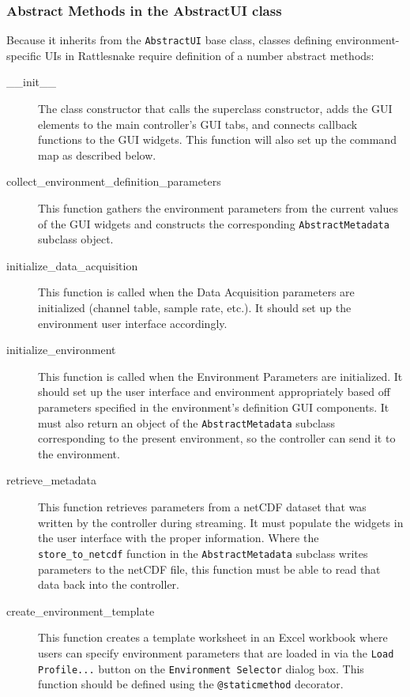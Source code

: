 \documentclass[pdf,12pt,report]{SANDreport}
\newcommand{\inlineCode}{\lstinline[basicstyle=\bfseries\ttfamily]}
\begin{document}
    \subsubsection{Abstract Methods in the AbstractUI class}
    
    Because it inherits from the \inlineCode{AbstractUI} base class, classes defining environment-specific \ac{UI}s in Rattlesnake require definition of a number abstract methods:
    
    \begin{description}
    \item[\_\_init\_\_] The class constructor that calls the superclass constructor, adds the \ac{GUI} elements to the main controller's \ac{GUI} tabs, and connects callback functions to the \ac{GUI} widgets.  This function will also set up the command map as described below.
   
    \item[collect\_environment\_definition\_parameters] This function gathers the environment parameters from the current values of the \ac{GUI} widgets and constructs the corresponding \inlineCode{AbstractMetadata} subclass object.
    
    \item[initialize\_data\_acquisition] This function is called when the Data Acquisition parameters are initialized (channel table, sample rate, etc.).  It should set up the environment user interface accordingly.
    
    \item[initialize\_environment] This function is called when the Environment Parameters are initialized.  It should set up the user interface and environment appropriately based off parameters specified in the environment's definition \ac{GUI} components.  It must also return an object of the \inlineCode{AbstractMetadata} subclass corresponding to the present environment, so the controller can send it to the environment.
    
    \item[retrieve\_metadata] This function retrieves parameters from a netCDF dataset that was written by the controller during streaming.  It must populate the widgets in the user interface with the proper information.  Where the \inlineCode{store_to_netcdf} function in the \inlineCode{AbstractMetadata} subclass writes parameters to the netCDF file, this function must be able to read that data back into the controller.
    
    \item[create\_environment\_template] This function creates a template worksheet in an Excel workbook where users can specify environment parameters that are loaded in via the \inlineCode{Load Profile...} button on the \inlineCode{Environment Selector} dialog box.  This function should be defined using the \inlineCode{@staticmethod} decorator.
    

\end{description}
\end{document}
